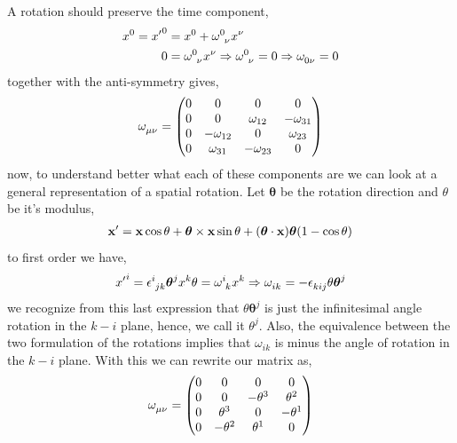 A rotation should preserve the time component,
\begin{align}
    x^0={x'}^0&=x^0+\tensor{\omega}{^0_\nu}x^\nu\\
    0&=\tensor{\omega}{^0_\nu}x^\nu\Rightarrow \tensor{\omega}{^0_\nu}=0\Rightarrow \tensor{\omega}{_0_\nu}=0
\end{align}
together with the anti-symmetry gives, 
\begin{align}
    \tensor{\omega}{_\mu_\nu} = \mqty(0&0&0&0\\0&0&\omega_{12}&-\omega_{31}\\0&-\omega_{12}&0&\omega_{23}\\0&\omega_{31}&-\omega_{23}&0)
\end{align}
now, to understand better what each of these components are we can look at a general representation of a spatial rotation. Let $\boldsymbol \theta$ be 
the rotation direction and $\theta$ be it's modulus,
\begin{align}
    \vb x '=\vb x\cos \theta+\boldsymbol \theta\times \vb x\sin\theta + \qty(\boldsymbol \theta\cdot \vb x)\boldsymbol \theta\qty(1-\cos\theta)
\end{align}
to first order we have,
\begin{align}
    {x'}^i=\tensor{\epsilon}{^i_j_k}\boldsymbol \theta^j x^k \theta=\tensor{\omega}{^i_k}x^k\Rightarrow \tensor{\omega}{_i_k} = -\tensor{\epsilon}{_k_i_j}\theta\boldsymbol \theta^j
\end{align}
we recognize from this last expression that $\theta\boldsymbol \theta^j$ is just the infinitesimal angle rotation in the $k-i$ plane, hence, we call it $\theta^j$. Also, the 
equivalence between the two formulation of the rotations implies that $\omega_{ik}$ is minus the angle of rotation in the $k-i$ plane. With this we can rewrite our matrix as,
\begin{align}
    \tensor{\omega}{_\mu_\nu} = \mqty(0&0&0&0\\0&0&-\theta^3&\theta^2\\0&\theta^3&0&-\theta^1\\0&-\theta^2&\theta^1&0)
\end{align}

\probitem{}

